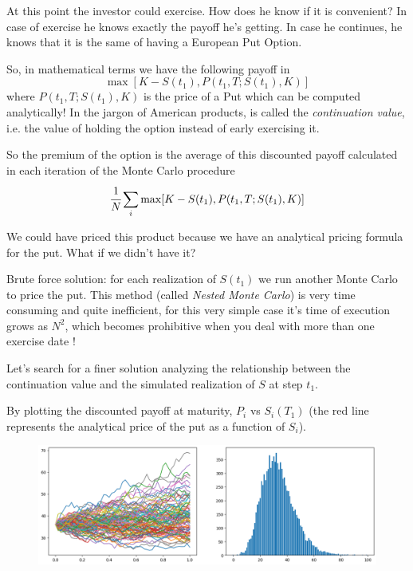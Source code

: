 \documentclass[12pt,a4paper]{article}
\begin{document}
At this point the investor could exercise. How does he know if it is convenient? In case of exercise he knows exactly the payoff he's getting. In case he continues, he knows that it is the same of having a European Put Option.

So, in mathematical terms we have the following payoff in 
\begin{equation}
	\max[K-S(t_1), P(t_1,T;S(t_1),K)]
\end{equation}
where $P(t_1,T;S(t_1),K)$ is the price of a Put which can be computed analytically! In the jargon of American products, 
is called the \emph{continuation value}, i.e. the value of holding the option instead of early exercising it.

So the premium of the option is the average of this discounted payoff calculated in each iteration of the Monte Carlo procedure
\begin{equation}
	\cfrac{1}{N}\sum_i\max[K-S(t_1), P(t_1,T;S(t_1),K)]
\end{equation}

We could have priced this product because we have an analytical pricing formula for the put. What if we didn't have it?

Brute force solution: for each realization of $S(t_1)$ we run another Monte Carlo to price the put. This method (called \emph{Nested Monte Carlo}) is very time consuming and quite inefficient, for this very simple case it's time of execution grows as $N^2$, which becomes prohibitive when you deal with more than one exercise date !

Let's search for a finer solution analyzing the relationship between the continuation value and the simulated realization of $S$ at step $t_1$. 

By plotting the discounted payoff at maturity, $P_i$ vs $S_i(T_1)$ (the red line represents the analytical price of the put as a function of $S_i$).

\begin{figure}[htbp]
	\begin{center}
		\includegraphics[width=0.8\linewidth]{addons/lsm_paths}
	\end{center}
	\label{fig:lsm_paths}
\end{figure}
\end{document}
